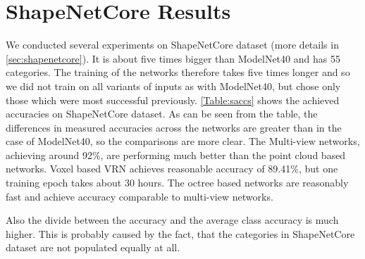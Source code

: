 \section{ShapeNetCore Results}
We conducted several experiments on ShapeNetCore dataset (more details in \autoref{sec:shapenetcore}). It is about five times bigger than ModelNet40 and has 55 categories. The training of the networks therefore takes five times longer and so we did not train on all variants of inputs as with ModelNet40, but chose only those which were most successful previously. \autoref{Table:saccs} shows the achieved accuracies on ShapeNetCore dataset.
As can be seen from the table, the differences in measured accuracies across the networks are greater than in the case of ModelNet40, so the comparisons are more clear. The Multi-view networks, achieving around 92\%, are performing much better than the point cloud based networks. Voxel based VRN achieves reasonable accuracy of 89.41\%, but one training epoch takes about 30 hours. The octree based networks are reasonably fast and achieve accuracy comparable to multi-view networks.  \par
Also the divide between the accuracy and the average class accuracy is much higher. This is probably caused by the fact, that the categories in ShapeNetCore dataset are not populated equally at all.





